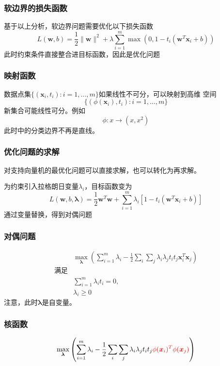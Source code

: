 \documentclass[14pt]{beamer}
\renewcommand{\vec}[1]{\bm{#1}}
\newcommand{\Vx}{\vec{x}}
\newcommand{\Vw}{\vec{w}}
\let\emph\relax %
\begin{document}
\begin{frame}
  \frametitle{软边界的损失函数}
  基于以上分析，软边界问题需要优化以下损失函数
  \begin{equation}
    L(\Vw,b)=\frac{1}{2}\|\Vw\|^2+\lambda\sum_{i=1}^{m}\max(0, 1-t_i(\Vw^T\Vx_i+b))
  \end{equation}
  此时约束条件直接整合进目标函数，因此是\emph{无约束}优化问题 
\end{frame}

\begin{frame}
  \frametitle{映射函数}
  数据点集$\{(\Vx_i, t_i):i=1,\ldots,m\}$如果线性不可分，可以映射到高维
  空间
  $$\{(\phi(\Vx_i), t_i):i=1,\ldots,m\}$$
  新集合可能线性可分。例如
  $$\phi:x\to(x, x^2)$$
  此时\emph{原空间}中的分类边界不再是直线。
\end{frame}

\begin{frame}
  \frametitle{优化问题的求解}
  对支持向量机的最优化问题可以直接求解，也可以转化为\emph{对偶问题}再求解。

  为约束引入拉格朗日变量$\lambda_i$，目标函数变为
  \begin{equation}
    L(\Vw,b,\vec{\lambda})=\frac{1}{2}\Vw^T\Vw+\sum_{i=1}^{m}\lambda_i[1-t_i(\Vw^T\Vx_i+b)]
  \end{equation}
  通过变量替换，得到对偶问题
\end{frame}

\begin{frame}
  \frametitle{对偶问题}
  \begin{equation}
    \begin{aligned}
    &\max_{\vec{\lambda}} \left(\sum_{i=1}^{m}\lambda_i-
    \frac{1}{2}\sum_i\sum_j\lambda_i\lambda_jt_it_j\Vx_i^T\Vx_j\right)\\
    \text{满足}&\\
    &\sum_{i=1}^{m}\lambda_it_i=0,\\
    &\lambda_i\ge0
  \end{aligned}
\end{equation}
  注意，此时$\vec{\lambda}$是自变量。

\end{frame}

\begin{frame}
  \frametitle{核函数}
  \[
  \max_{\vec{\lambda}} \left(\sum_{i=1}^{m}\lambda_i-
    \frac{1}{2}\sum_i\sum_j\lambda_i\lambda_jt_it_j{\color{red}\phi(\Vx_i)^T\phi(\Vx_j)}\right)
  \]
\end{frame}
\end{document}
